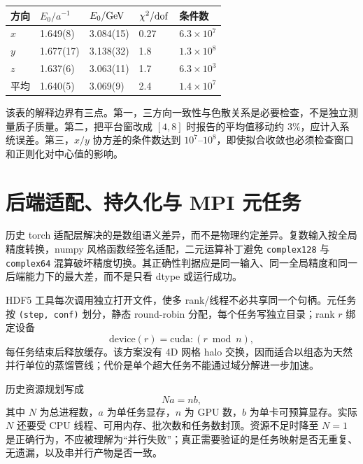 \begin{center}
\small
\begin{tabularx}{\textwidth}{lXXXX}
\toprule
方向 & $E_0/a^{-1}$ & $E_0/{\rm GeV}$ & $\chi^2/{\rm dof}$ & 条件数\\
\midrule
$x$ & 1.649(8) & 3.084(15) & 0.27 & $6.3\times10^7$\\
$y$ & 1.677(17) & 3.138(32) & 1.8 & $1.3\times10^8$\\
$z$ & 1.637(6) & 3.063(11) & 1.7 & $6.3\times10^3$\\
平均 & 1.640(5) & 3.069(9) & 2.4 & $1.4\times10^7$\\
\bottomrule
\end{tabularx}
\end{center}

该表的解释边界有三点。第一，三方向一致性与色散关系是必要检查，不是独立测量质子质量。第二，把平台窗改成 $[4,8]$ 时报告的平均值移动约 $3\%$，应计入系统误差。第三，$x/y$ 协方差的条件数达到 $10^7$--$10^8$，即使拟合收敛也必须检查窗口和正则化对中心值的影响。

\section{后端适配、持久化与 MPI 元任务}

历史 torch 适配层解决的是数组语义差异，而不是物理约定差异。复数输入按全局精度转换，numpy 风格函数经签名适配，二元运算补丁避免 \texttt{complex128} 与 \texttt{complex64} 混算破坏精度切换。其正确性判据应是同一输入、同一全局精度和同一后端能力下的最大差，而不是只看 dtype 或运行成功。

HDF5 工具每次调用独立打开文件，使多 rank/线程不必共享同一个句柄。元任务按 \texttt{(step, conf)} 划分，静态 round-robin 分配，每个任务写独立目录；rank $r$ 绑定设备
\begin{equation}
  \mathrm{device}(r)=\mathrm{cuda}:(r\bmod n),
  \label{eq:b07-gpumap}
\end{equation}
每任务结束后释放缓存。该方案没有 4D 网格 halo 交换，因而适合以组态为天然并行单位的蒸馏管线；代价是单个超大任务不能通过域分解进一步加速。

历史资源规划写成
\begin{equation}
  N a=n b,
  \label{eq:b07-resource}
\end{equation}
其中 $N$ 为总进程数，$a$ 为单任务显存，$n$ 为 GPU 数，$b$ 为单卡可预算显存。实际 $N$ 还要受 CPU 线程、可用内存、批次数和任务数封顶。资源不足时降至 $N=1$ 是正确行为，不应被理解为“并行失败”；真正需要验证的是任务映射是否无重复、无遗漏，以及串并行产物是否一致。

